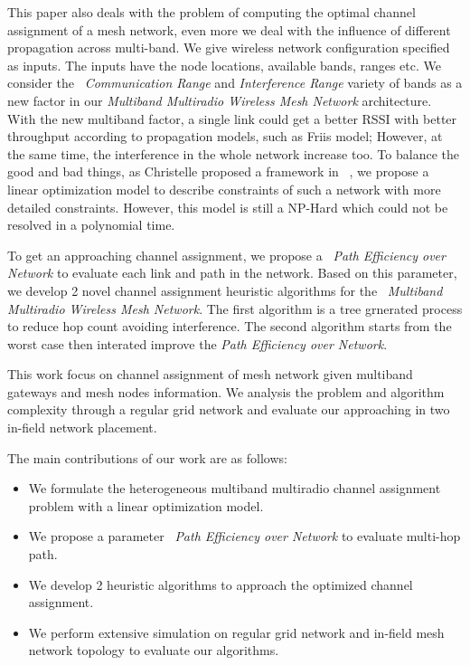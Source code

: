 This paper also deals with the problem of computing the optimal channel assignment of a mesh network, even more we deal with the influence of different propagation across multi-band. We give wireless network configuration specified as inputs. 
The inputs have the node locations, available bands, ranges etc. We consider the ~\emph{Communication Range} and \emph{Interference Range} variety of bands as a new factor in our \emph{Multiband Multiradio Wireless Mesh Network} architecture.  
With the new multiband factor, a single link could get a better RSSI with better throughput according to propagation models, such as Friis model; However, at the same time, the interference in the whole network increase too. 
To balance the good and bad things, as Christelle proposed a framework in ~\cite{yuan2006cross}, we propose a linear optimization model to describe constraints of such a network with more detailed constraints. However, this model is still a NP-Hard which could not be resolved in a polynomial time. 

To get an approaching channel assignment, we propose a ~\emph{Path Efficiency over Network} to evaluate each link and path in the network. Based on this parameter, we develop 2 novel channel assignment heuristic algorithms for the ~\emph{Multiband Multiradio Wireless Mesh Network}. The first algorithm is a tree grnerated process to reduce hop count avoiding interference. The second algorithm starts from the worst case then interated improve the \emph{Path Efficiency over Network}.

This work focus on channel assignment of mesh network given multiband gateways and mesh nodes information.
We analysis the problem and algorithm complexity through a regular grid network and evaluate our approaching in two in-field network placement. 

% 
The main contributions of our work are as follows:
\begin{itemize}
\item We formulate the heterogeneous multiband multiradio channel assignment problem with a linear optimization model.  

\item We propose a parameter ~\emph{Path Efficiency over Network} to evaluate multi-hop path.

\item We develop 2 heuristic algorithms to approach the optimized channel assignment.

\item We perform extensive simulation on regular grid network and in-field mesh network topology to evaluate our algorithms.


\end{itemize}

